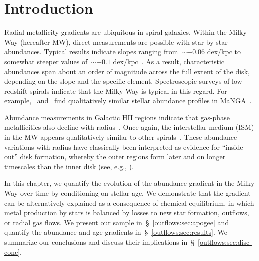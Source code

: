 \section{Introduction}
\label{outflows:sec:intro}
Radial metallicity gradients are ubiquitous in spiral galaxies.
Within the Milky Way (hereafter MW), direct measurements are possible with
star-by-star abundances.
Typical results indicate slopes ranging from~$\sim$$-0.06$ dex/kpc to somewhat
steeper values of~$\sim$$-0.1$ dex/kpc~\citep[e.g.,][]{Nordstroem2004,
Cheng2012, Frinchaboy2013, Hayden2014, Weinberg2019, Myers2022}.
As a result, characteristic abundances span about an order of magnitude across
the full extent of the disk, depending on the slope and the specific element.
Spectroscopic surveys of low-redshift spirals indicate that the Milky Way is
typical in this regard.
For example,~\citet{Goddard2017} and~\citet{Parikh2021} find qualitatively
similar stellar abundance profiles in MaNGA~\citep{Bundy2015}.
\par
Abundance measurements in Galactic HII regions indicate that gas-phase
metallicities also decline with radius~\citep[e.g.,][]{Simpson1995,
Afflerbach1997, Esteban2022, MendezDelgado2022, MendezDelgado2023}.
Once again, the interstellar medium (ISM) in the MW appears qualitatively
similar to other spirals~\citep[e.g.,][]{Belfiore2017, Berg2020,
Franchetto2021, Lutz2021, Boardman2022}.
These abundance variations with radius have classically been interpreted as
evidence for ``inside-out'' disk formation, whereby the outer regions form
later and on longer timescales than the inner disk (see, e.g.,
\citealt{Kauffmann1996}).
\par
In this chapter, we quantify the evolution of the abundance gradient in the
Milky Way over time by conditioning on stellar age.
We demonstrate that the gradient can be alternatively explained as a
consequence of chemical equilibrium, in which metal production by stars is
balanced by losses to new star formation, outflows, or radial gas flows.
We present our sample in~\S~\ref{outflows:sec:apogee} and quantify the
abundance and age gradients in~\S~\ref{outflows:sec:results}.
We summarize our conclusions and discuss their implications
in~\S~\ref{outflows:sec:disc-conc}.

